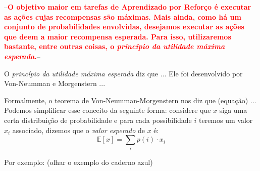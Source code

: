 \documentclass{article}
\newcommand{\todo}[1]{ --\textcolor{red}{\textbf{#1}}--}
\begin{document}
        \todo{O objetivo maior em tarefas de Aprendizado por Reforço é executar as ações cujas recompensas são máximas. Mais ainda, como há um conjunto de probabilidades envolvidas, desejamos executar as ações que deem a maior recompensa esperada. Para isso, utilizaremos bastante, entre outras coisas, o \emph{princípio da utilidade máxima esperada}.}

        O \emph{princípio da utilidade máxima esperada} diz que ... Ele foi desenvolvido por Von-Neumman e Morgenstern ...
        
        Formalmente, o teorema de Von-Neumman-Morgenstern nos diz que (equação) ... Podemos simplificar esse conceito da seguinte forma: considere que $x$ siga uma certa distribuição de probabilidade e para cada possibilidade $i$ teremos um valor $x_i$ associado, dizemos que o \emph{valor esperado} de $x$ é:
        \begin{equation}
            \mathbb{E} \left [ x \right ] = \sum_{i} p(i) \cdot x_i
        \end{equation}
        
        Por exemplo: (olhar o exemplo do caderno azul)
    
\end{document}
